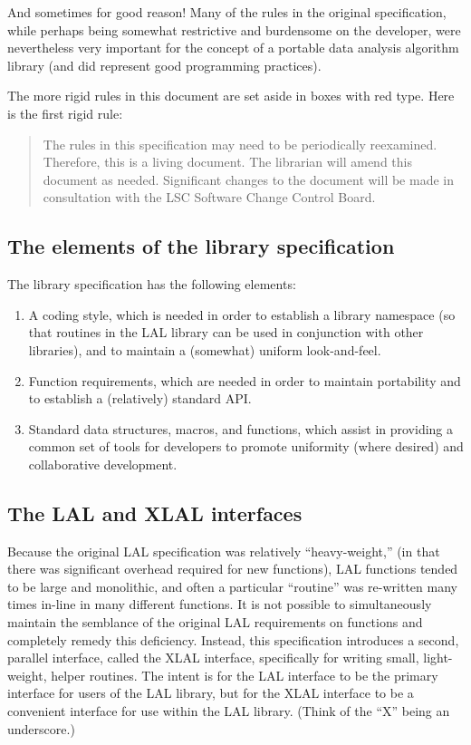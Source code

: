 \documentclass[10pt]{ligodcc}
\newlength{\fminilength}
\newenvironment{fminipage}[1][\linewidth]
  {\setlength{\fminilength}{#1-2\fboxsep-2\fboxrule}%
   \begin{lrbox}{\fminibox}\begin{minipage}{\fminilength}}
  {\end{minipage}\end{lrbox}\noindent\fbox{\usebox{\fminibox}}}
\newenvironment{lalrule}{\begin{quote}\color{red}\begin{fminipage}}
  {\end{fminipage}\end{quote}}
\begin{document}
And sometimes for good reason!  Many of the rules in the original
specification, while perhaps being somewhat restrictive and burdensome on the
developer, were nevertheless very important for the concept of a portable data
analysis algorithm library (and did represent good programming practices).

The more rigid rules in this document are set aside in boxes with red type.
Here is the first rigid rule:
\begin{lalrule}
The rules in this specification may need to be periodically reexamined.
Therefore, this is a living document.  The librarian will amend this
document as needed.  Significant changes to the document will be made in
consultation with the LSC Software Change Control Board.
\end{lalrule}


\subsection{The elements of the library specification}

The library specification has the following elements:
\begin{enumerate}
\item A coding style, which is needed in order to establish a library namespace
(so that routines in the LAL library can be used in conjunction with other
libraries), and to maintain a (somewhat) uniform look-and-feel.
\item Function requirements, which are needed in order to maintain portability
and to establish a (relatively) standard API.
\item Standard data structures, macros, and functions, which assist in
providing a common set of tools for developers to promote uniformity (where
desired) and collaborative development.
\end{enumerate}


\subsection{The LAL and XLAL interfaces}

Because the original LAL specification was relatively ``heavy-weight,''
(in that there was significant overhead required for new functions), LAL
functions tended to be large and monolithic, and often a particular ``routine''
was re-written many times in-line in many different functions.  It is not
possible to simultaneously maintain the semblance of the original LAL
requirements on functions and completely remedy this deficiency.  Instead,
this specification introduces a second, parallel interface, called the XLAL
interface, specifically for writing small, light-weight, helper routines.  The
intent is for the LAL interface to be the primary interface for users of the
LAL library, but for the XLAL interface to be a convenient interface for use
within the LAL library.  (Think of the ``X'' being an underscore.)
\end{document}
